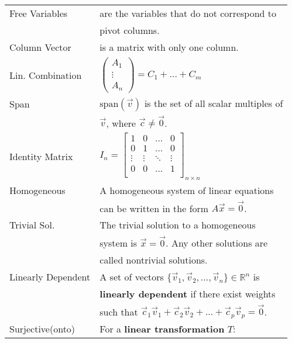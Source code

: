 \documentclass[5pt]{article}
\begin{document}
\begin{multicols}{2}
\begin{tabular}{ll}
    Free Variables          & are the variables that do not correspond to\\
                            & pivot columns.\\
    Column Vector           & is a matrix with only one column.\\
    Lin. Combination        & \footnotesize{$\begin{pmatrix}A_1\\ \vdots\\ A_n\end{pmatrix}=C_1 + ... + C_m$}\\
    Span                    & $\text{span}(\vec{v})$ is the set of all scalar multiples of\\
                            & $\vec{v}$, where $\vec{c}\neq\vec{0}$. \\
    Identity Matrix         & \footnotesize{$I_n=\begin{bmatrix}
                                  1 & 0 & ... & 0 \\
                                  0 & 1 & ... & 0 \\
                                  \vdots & \vdots & \ddots & \vdots \\
                                  0 & 0 & ... & 1 \\
                                \end{bmatrix}_{n\times n}$}\\
   Homogeneous              & A homogeneous system of linear equations\\
                            & can be written in the form $A\vec{x}=\vec{0}$.\\
   Trivial Sol.             & The trivial solution to a homogeneous\\
                            & system is $\vec{x}=\vec{0}$. Any other solutions are\\
                            & called nontrivial solutions.\\
\small{Linearly Dependent}  & A set of vectors $\{\vec{v}_1, \vec{v}_2, ..., \vec{v}_n\}\in\mathbb{R}^n$ is\\
                            & \textbf{linearly dependent} if there exist weights\\
                            & such that $\vec{c}_1\vec{v}_1 + \vec{c}_2\vec{v}_2 + ... + \vec{c}_p\vec{v}_p=\vec{0}$.\\
\small{Surjective}\footnotesize{(onto)}                  & For a \textbf{linear transformation} $T$:\\

\end{tabular}
\end{multicols}
\end{document}
